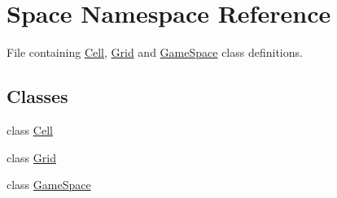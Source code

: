 \hypertarget{namespaceSpace}{\section{\-Space \-Namespace \-Reference}
\label{namespaceSpace}
}


\-File containing \hyperlink{classSpace_1_1Cell}{\-Cell}, \hyperlink{classSpace_1_1Grid}{\-Grid} and \hyperlink{classSpace_1_1GameSpace}{\-Game\-Space} class definitions.  


\subsection*{\-Classes}
\begin{DoxyCompactItemize}
\item 
class \hyperlink{classSpace_1_1Cell}{\-Cell}
\item 
class \hyperlink{classSpace_1_1Grid}{\-Grid}
\item 
class \hyperlink{classSpace_1_1GameSpace}{\-Game\-Space}
\end{DoxyCompactItemize}
